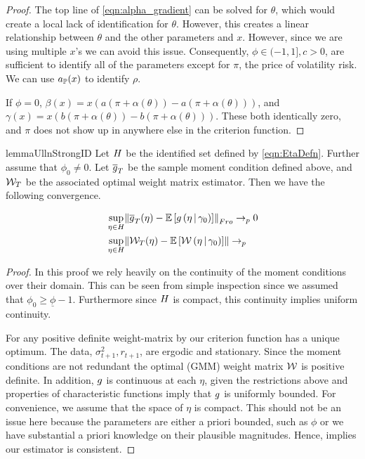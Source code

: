 \documentclass[11pt, letterpaper, twoside, final]{article}
\begin{document}
\begin{appendices}
\begin{proof}
    The top line of \cref{eqn:alpha_gradient} can be solved for $\theta$, which would create a local lack of
    identification for $\theta$.
    However, this creates a linear relationship between $\theta$ and the other parameters and $x$.
    However, since we are using multiple $x$'s we can avoid this issue.
    Consequently,  $\phi \in (-1,1], c > 0$, are sufficient to identify all of the parameters except for $\pi$,
    the price of volatility risk.
    We can use $a_{\mathbb{P}}(x)$ to identify $\rho$.
    
    If $\phi = 0$, $\beta(x) = x \left(a (\pi + \alpha(\theta)) - a(\pi + \alpha(\theta))\right)$, and
    $\gamma(x) =  x \left(b (\pi + \alpha(\theta)) - b(\pi + \alpha(\theta))\right)$.
    These both  identically zero, and $\pi$ does not show up in anywhere  else in the criterion function.
    
    \end{proof}


\begin{restatable}{lemma}{UllnStrongID}
    \label{lemma:UniformConvergenceStrongID}
    Let $H$ be the identified set defined by \cref{eqn:EtaDefn}.
    Further assume that $\phi_0 \neq 0$. 
    Let $\overline{g}_T$ be the sample moment condition defined above, and $\mathcal{W}_T$ be the associated optimal weight matrix
    estimator.
    Then we have the following convergence.

    \begin{align}
        &\sup_{\eta \in \Eta} \norm*{\sampmom(\eta) - \E\left[g\left(\eta \mvert \gamma_0\right)\right]}_{Fro}
          \pto 0 \\ 
        &\sup_{\eta \in \Eta} \norm{\W_{T}(\eta)-\E\left[\W\left(\eta \mvert \gamma_0\right)\right]} \pto 
    \end{align}

\end{restatable}

\begin{proof}

    In this proof we rely heavily on the continuity of the moment conditions over their domain. 
    This can be seen from simple inspection since we assumed that $\phi_0 \geq \underline{\phi} -1$.
    Furthermore since $H$ is compact, this continuity implies uniform continuity.
    
    For any positive definite weight-matrix by \textcite[Lemma 2.3]{newey1994large} our criterion function has
    a unique optimum.
    The data, $\sigma^2_{t+1}, r_{t+1}$, are ergodic and stationary.
    Since the moment conditions are not redundant the optimal (GMM) weight matrix $\mathcal{W}$ is positive definite. 
    In addition, $g$ is continuous at each $\eta$, given the restrictions above and properties of
    characteristic functions imply that $g$ is uniformly bounded. 
    For convenience, we assume that the space of $\eta$ is compact.
    This should not be an issue here because the parameters  are either a priori bounded, such as $\phi$ or we
    have substantial a priori knowledge on their plausible magnitudes.
    Hence, \textcite[Theroem 2.6]{newey1994large} implies our estimator is consistent.
    

\end{proof}
\end{appendices}
\end{document}
